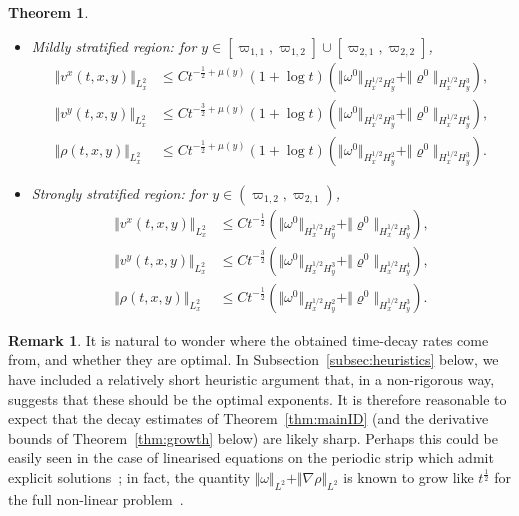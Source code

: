 \documentclass[11pt,reqno]{amsproc}
\newcounter{bigthm}
\newtheorem{bigtheorem}[bigthm]{Theorem}
\theoremstyle{definition}
\newtheorem{remark}[proposition]{Remark}
\numberwithin{equation}{section}
\begin{document}
\begin{bigtheorem}
\begin{itemize}
\item {\em Mildly stratified region:} for $y\in [\varpi_{1,1}, \varpi_{1,2}] \cup [\varpi_{2,1}, \varpi_{2,2}]$,
\begin{align}
\Vert v^x(t,x,y) \Vert_{L^2_x}  & \leq C t^{-\frac12+\mu(y)}( 1 + \log t) \left(  \Vert \omega^0 \Vert_{H^{1/2}_x H^2_y} + \Vert \varrho^0 \Vert_{H^{1/2}_x H^3_y}\right), \label{eq:decayvxmild} \\
\Vert v^y(t,x,y) \Vert_{L^2_x}  &\leq C t^{-\frac32+\mu(y)}(1+\log t)  \left(  \Vert \omega^0 \Vert_{H^{1/2}_x H^3_y} + \Vert \varrho^0 \Vert_{H^{1/2}_x H^4_y}\right),\label{eq:decayvymild}\\
\Vert \rho(t,x,y) \Vert_{L^2_x} &\leq C t^{-\frac12+\mu(y)} ( 1 + \log t) \left(  \Vert \omega^0 \Vert_{H^{1/2}_x H^2_y} + \Vert \varrho^0 \Vert_{H^{1/2}_x H^3_y}\right). \label{eq:decayrhomild} 
\end{align}

\item {\em Strongly stratified region:} for $y\in (\varpi_{1,2}, \varpi_{2,1})$,
\begin{align}
\Vert v^x(t,x,y) \Vert_{L^2_x}  & \leq C t^{-\frac12}\left(  \Vert \omega^0 \Vert_{H^{1/2}_x H^2_y} + \Vert \varrho^0 \Vert_{H^{1/2}_x H^3_y}\right), \label{eq:decayvxstrong} \\
\Vert v^y(t,x,y) \Vert_{L^2_x}  &\leq C t^{-\frac32}\left(  \Vert \omega^0 \Vert_{H^{1/2}_x H^3_y} + \Vert \varrho^0 \Vert_{H^{1/2}_x H^4_y}\right),\label{eq:decayvystrong}\\
\Vert \rho(t,x,y) \Vert_{L^2_x} &\leq C t^{-\frac12} \left(  \Vert \omega^0 \Vert_{H^{1/2}_x H^2_y} + \Vert \varrho^0 \Vert_{H^{1/2}_x H^3_y}\right). \label{eq:decayrhostrong} 
\end{align}
\end{itemize}
\end{bigtheorem}


\begin{remark}
It is natural to wonder where the obtained time-decay rates come from, and whether they are optimal. In Subsection~\ref{subsec:heuristics} below, we have included a relatively short heuristic argument that, in a non-rigorous way, suggests that these should be the optimal exponents. It is therefore reasonable to expect that the decay estimates of Theorem~\ref{thm:mainID} (and the derivative bounds of Theorem~\ref{thm:growth} below) are likely sharp. Perhaps this could be easily seen in the case of  linearised equations on the periodic strip which admit explicit solutions~\cite{CZN23strip}; in fact, the quantity $\Vert \omega \Vert_{L^2} + \Vert \nabla\rho \Vert_{L^2}$ is known to grow like $t^\frac12$ for the full non-linear problem~\cite{BBCZD21}.
\end{remark}
\end{document}
